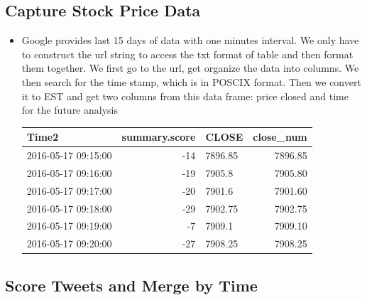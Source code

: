 \documentclass[a0,landscape]{a0poster}\usepackage[]{graphicx}\usepackage[]{color}
\newenvironment{knitrout}{}{} %
\begin{document}
\begin{multicols}{4}
\begin{itemize}
\end{itemize}

\subsection*{Capture Stock Price Data}

\begin{itemize}

\item Google provides last 15 days of data with one minutes interval. We only have to construct the url string to access the txt format of table and then format them together. We first go to the url, get organize the data into columns. We then search for the time stamp, which is in POSCIX format. Then we convert it to EST and get two columns from this data frame: price closed and time for the future analysis 
\\

\begin{center}

\begin{knitrout}
\color{fgcolor}
\begin{tabular}{l|r|l|r}
\hline
Time2 & summary.score & CLOSE & close\_num\\
\hline
2016-05-17 09:15:00 & -14 & 7896.85 & 7896.85\\
\hline
2016-05-17 09:16:00 & -19 & 7905.8 & 7905.80\\
\hline
2016-05-17 09:17:00 & -20 & 7901.6 & 7901.60\\
\hline
2016-05-17 09:18:00 & -29 & 7902.75 & 7902.75\\
\hline
2016-05-17 09:19:00 & -7 & 7909.1 & 7909.10\\
\hline
2016-05-17 09:20:00 & -27 & 7908.25 & 7908.25\\
\hline
\end{tabular}


\end{knitrout}

\end{center}

\end{itemize}


\subsection*{ Score Tweets and Merge by Time}

\begin{itemize}


\end{itemize}
\end{multicols}
\end{document}
